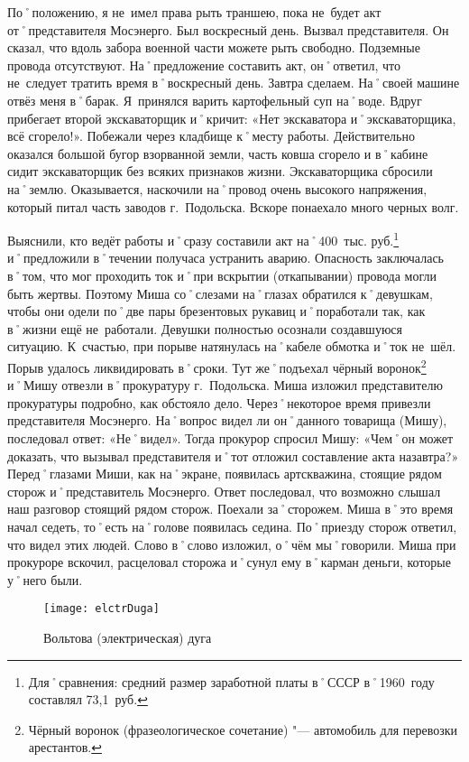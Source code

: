 По˚положению, я не~имел права рыть траншею, пока не~будет акт от˚представителя Мосэнерго. Был воскресный день. Вызвал представителя. Он сказал, что вдоль забора военной части можете рыть свободно. Подземные провода отсутствуют. На˚предложение составить акт, он˚ответил, что не~следует тратить время в˚воскресный день. Завтра сделаем. На˚своей машине отвёз меня в˚барак. Я~принялся варить картофельный суп на˚воде. Вдруг прибегает второй экскаваторщик и˚кричит: «Нет экскаватора и˚экскаваторщика, всё сгорело!». Побежали через кладбище к˚месту работы. Действительно оказался большой бугор взорванной земли, часть ковша сгорело и в˚кабине сидит экскаваторщик без всяких признаков жизни. Экскаваторщика сбросили на˚землю. Оказывается, наскочили на˚провод очень высокого напряжения, который питал часть заводов г.~Подольска. Вскоре понаехало много черных волг. 

Выяснили, кто ведёт работы и˚сразу составили акт на˚400~тыс. руб.\footnote{Для˚сравнения: средний размер заработной платы в˚СССР в˚1960~году составлял 73,1~руб.} и˚предложили в˚течении получаса устранить аварию. Опасность заключалась в˚том, что мог проходить ток и˚при вскрытии (откапывании) провода могли быть жертвы. Поэтому Миша со˚слезами на˚глазах обратился к˚девушкам, чтобы они одели по˚две пары брезентовых рукавиц и˚поработали так, как в˚жизни ещё не~работали. Девушки полностью осознали создавшуюся ситуацию. К~счастью, при порыве натянулась на˚кабеле обмотка и˚ток не~шёл. Порыв удалось ликвидировать в˚сроки. Тут же˚подъехал чёрный воронок\footnote{Чёрный воронок (фразеологическое сочетание) "--- автомобиль для перевозки арестантов.} и˚Мишу отвезли в˚прокуратуру г.~Подольска. Миша изложил представителю прокуратуры подробно, как обстояло дело. Через˚некоторое время привезли представителя Мосэнерго. На˚вопрос видел ли он˚данного товарища (Мишу), последовал ответ: «Не˚видел». Тогда прокурор спросил Мишу: «Чем˚он может доказать, что вызывал представителя и˚тот отложил составление акта назавтра?»
Перед˚глазами Миши, как на˚экране, появилась артскважина, стоящие рядом сторож и˚представитель Мосэнерго. Ответ последовал, что возможно слышал наш разговор стоящий рядом сторож. Поехали за˚сторожем. Миша в˚это время начал седеть, то˚есть на˚голове появилась седина. По˚приезду сторож ответил, что видел этих людей. Слово в˚слово изложил, о˚чём мы˚говорили. Миша при прокуроре вскочил, расцеловал сторожа и˚сунул ему в˚карман деньги, которые у˚него были.

\begin{wrapfigure}{O}{.4\textwidth}
\centering
\texttt{[image: elctrDuga]}
\caption{Вольтова (электрическая) дуга}
\label{fig:elctrDuga}
\end{wrapfigure}

